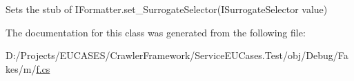 Sets the stub of I\-Formatter.\-set\-\_\-\-Surrogate\-Selector(\-I\-Surrogate\-Selector value)



The documentation for this class was generated from the following file\-:\begin{DoxyCompactItemize}
\item 
D\-:/\-Projects/\-E\-U\-C\-A\-S\-E\-S/\-Crawler\-Framework/\-Service\-E\-U\-Cases.\-Test/obj/\-Debug/\-Fakes/m/\hyperlink{m_2f_8cs}{f.\-cs}\end{DoxyCompactItemize}
